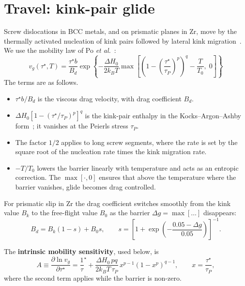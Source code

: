 \documentclass[11pt]{article}
\newcommand{\ts}{\tau^{\star}}
\newcommand{\kT}{k_BT}
\numberwithin{equation}{section}
\begin{document}
\section{Travel: kink-pair glide}
Screw dislocations in BCC metals, and on prismatic planes in Zr, move by the thermally activated nucleation of kink pairs followed by lateral kink migration~\cite{HirthLothe,DornRajnak1964}. We use the mobility law of Po \emph{et al.}~\cite{Po2016}:
\begin{equation}
\boxed{\;v_g(\ts,T)=\frac{\ts b}{B_d}\exp\left\{-\frac{\Delta H_0}{2\kT}\max\!\left[\left(1-\left(\frac{\ts}{\tau_P}\right)^p\right)^q-\frac{T}{T_0},\;0\right]\right\}\;}
\label{eq:vg}
\end{equation}
The terms are as follows.
\begin{itemize}
\item $\ts b/B_d$ is the viscous drag velocity, with drag coefficient $B_d$.
\item $\Delta H_0[1-(\ts/\tau_P)^p]^q$ is the kink-pair enthalpy in the Kocks--Argon--Ashby form~\cite{KocksArgonAshby}; it vanishes at the Peierls stress $\tau_P$.
\item The factor $1/2$ applies to long screw segments, where the rate is set by the square root of the nucleation rate times the kink migration rate.
\item $-T/T_0$ lowers the barrier linearly with temperature and acts as an entropic correction. The $\max[\cdot,0]$ ensures that above the temperature where the barrier vanishes, glide becomes drag controlled.
\end{itemize}
For prismatic slip in Zr the drag coefficient switches smoothly from the kink value $B_k$ to the free-flight value $B_0$ as the barrier $\Delta g=\max[\ldots]$ disappears:
\begin{equation}
B_d=B_k(1-s)+B_0s,\qquad s=\left[1+\exp\left(-\frac{0.05-\Delta g}{0.05}\right)\right]^{-1}.
\label{eq:drag_switch}
\end{equation}

The \textbf{intrinsic mobility sensitivity}, used below, is
\begin{equation}
A\equiv\frac{\partial\ln v_g}{\partial\ts}=\frac1\ts+\frac{\Delta H_0\,pq}{2\kT\,\tau_P}\,x^{p-1}(1-x^p)^{q-1},\qquad x=\frac{\ts}{\tau_P},
\label{eq:A}
\end{equation}
where the second term applies while the barrier is non-zero.

\end{document}
